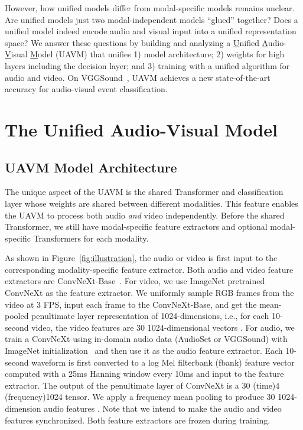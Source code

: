 \documentclass[journal]{IEEEtran}
\newcommand{\rev}[1]{{\color{dblue} #1}}
\begin{document}
\rev{However, how unified models differ from modal-specific models remains unclear. Are unified models just two modal-independent models ``glued'' together? Does a unified model indeed encode audio and visual input into a unified representation space? We answer these questions by building and analyzing a \underline{U}nified \underline{A}udio-\underline{V}isual \underline{M}odel (UAVM) that unifies 1) model architecture; 2) weights for high layers including the decision layer; and 3) training with a unified algorithm for audio and video. On VGGSound~\cite{chen2020vggsound}, UAVM achieves a new state-of-the-art accuracy for audio-visual event classification.}

\section{The Unified Audio-Visual Model}
\subsection{UAVM Model Architecture}
\label{sec:mdl_arc}

The unique aspect of the UAVM is the shared Transformer and classification layer whose weights are shared between different modalities.  This feature enables the UAVM to process both audio \emph{and} video independently. Before the shared Transformer, we still have modal-specific feature extractors and optional modal-specific Transformers for each modality.

As shown in Figure~\ref{fig:illustration}, the audio or video is first input to the corresponding modality-specific feature extractor. Both audio and video feature extractors are ConvNeXt-Base~\cite{liu2022convnet}. For video, we use ImageNet pretrained ConvNeXt as the feature extractor. We uniformly sample RGB frames from the video at 3 FPS, input each frame to the ConvNeXt-Base, and get the mean-pooled penultimate layer representation of 1024-dimensions, i.e., for each 10-second video, the video features are 30 1024-dimensional vectors . For audio, we train a ConvNeXt using in-domain audio data (AudioSet or VGGSound) with ImageNet initialization~\cite{gong_psla} and then use it as the audio feature extractor. Each 10-second waveform is first converted to a  log Mel filterbank (fbank) feature vector computed with a 25ms Hanning window every 10ms and input to the feature extractor. The output of the penultimate layer of ConvNeXt is a 30 (time)4 (frequency)1024 tensor. We apply a frequency mean pooling to produce 30 1024-dimension audio features . Note that we intend to make the audio and video features synchronized. Both feature extractors are frozen during training. 
\end{document}
